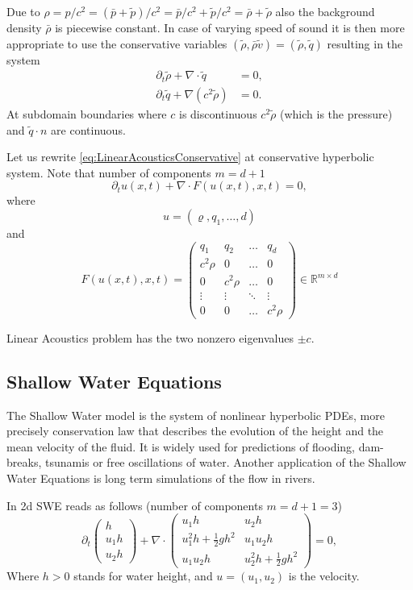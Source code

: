\documentclass[a4paper,12pt]{article}
\theoremstyle{definition}
\theoremstyle{definition}
\newcommand{\Dim}{d}
\begin{document}
Due to $\rho = p/c^2 = (\bar{p} + \tilde{p})/c^2 = \bar{p}/c^2 +\tilde{p}/c^2 = \bar\rho + \tilde\rho$
also the background density $\bar\rho$ is piecewise constant. In case of varying speed of sound
it is then more appropriate to use the conservative variables $(\tilde\rho, \bar{\rho} \tilde{v}) = (\tilde\rho,\tilde{q})$
resulting in the system
\begin{subequations}\label{eq:LinearAcousticsConservative}
	\begin{align}
	\partial_t \tilde{\rho} +  \nabla\cdot\tilde{q} &= 0,\\
	\partial_t \tilde{q} + \nabla (c^2\tilde{\rho}) &= 0.
	\end{align}
\end{subequations}
At subdomain boundaries where $c$ is discontinuous $c^2\tilde\rho$
(which is the pressure) and $\tilde{q}\cdot n$ are continuous.

Let us rewrite \eqref{eq:LinearAcousticsConservative} at conservative hyperbolic system. Note that number of components $m=\Dim+1$
$$\partial_t u(x,t) + \nabla\cdot F(u(x,t),x,t) = 0,$$
where 
$$u = (\varrho,q_1,\dots,\Dim) $$
and 
$$F(u(x,t),x,t) = \left( \begin{smallmatrix}
q_1  & q_2 & \dots & q_\Dim\\
c^2\rho & 0 & \dots & 0\\
0 & c^2\rho & \dots & 0\\
\vdots & \vdots & \ddots & \vdots\\
0 & 0 & \dots & c^2\rho 
\end{smallmatrix} \right)\in \mathbb{R}^{m\times \Dim} $$

Linear Acoustics problem has the two nonzero eigenvalues $\pm c$.


\subsection{Shallow Water Equations}
The Shallow Water model is the system of nonlinear hyperbolic PDEs, more precisely conservation law that describes the evolution of the height and the mean velocity of the fluid. It is widely used for predictions of flooding, dam-breaks, tsunamis or free oscillations of water. Another application of the Shallow Water Equations is long term simulations of the flow in rivers.

In 2d SWE reads as follows (number of components $m=\Dim+1=3$)
\begin{equation}\label{eq:swe2D}
\partial_t \begin{pmatrix}
h\\
u_1h\\
u_2h
\end{pmatrix}+ \nabla\cdot
\left( \begin{matrix}
u_1h   & u_2h\\
u_1^2h + \frac{1}{2}gh^2 & u_1u_2h\\
u_1u_2h & u_2^2h + \frac{1}{2}gh^2
\end{matrix}\right) = 0,
\end{equation}
Where $h>0$ stands for water height, and $u=(u_1,u_2)$ is the velocity.
\end{document}

